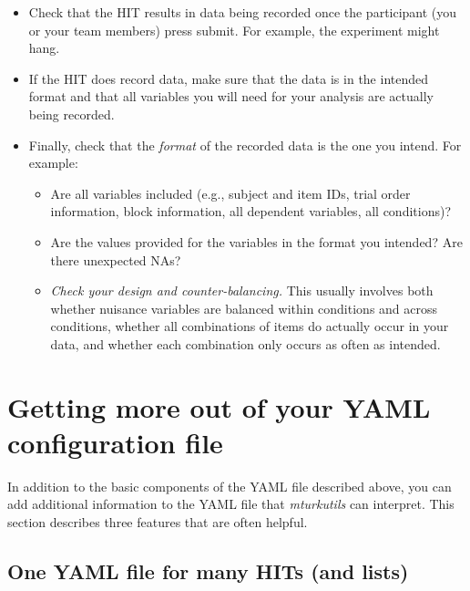 \documentclass{article}
\begin{document}
\begin{itemize}
\begin{tcolorbox}[colback=gray!5,colframe=blue!40!black,title=Sandbox checklist---after obtaining results from sandbox]
  \begin{itemize}
    \item Check that the HIT results in data being recorded once the participant (you or your team members) press submit. For example, the experiment might hang.
    \item If the HIT does record data, make sure that the data is in the intended format and that all variables you will need for your analysis are actually being recorded.
    \item Finally, check that the {\em format} of the recorded data is the one you intend. For example:
    \begin{itemize}
      \item Are all variables included (e.g., subject and item IDs, trial order information, block information, all dependent variables, all conditions)?
      \item Are the values provided for the variables in the format you intended? Are there unexpected NAs?
      \item {\em Check your design and counter-balancing.} This usually involves both whether nuisance variables are balanced within conditions and across conditions, whether all combinations of items do actually occur in your data, and whether each combination only occurs as often as intended.
    \end{itemize}
  \end{itemize}
\end{tcolorbox}

\end{itemize}





\section{Getting more out of your YAML configuration file}
In addition to the basic components of the YAML file described above, you can add additional information to the YAML file that {\em mturkutils} can interpret. This section describes three features that are often helpful.

\subsection{One YAML file for many HITs (and lists)}
\end{document}
